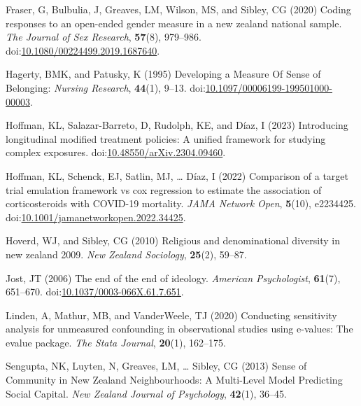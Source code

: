 \documentclass[
  singlecolumn]{article}
\newlength{\cslhangindent}
\newenvironment{CSLReferences}[2] %
 {\begin{list}{}{%
  \setlength{\itemindent}{0pt}
  \setlength{\leftmargin}{0pt}
  \setlength{\parsep}{0pt}
  \ifodd #1
   \setlength{\leftmargin}{\cslhangindent}
   \setlength{\itemindent}{-1\cslhangindent}
  \fi
  \setlength{\itemsep}{#2\baselineskip}}}
 {\end{list}}
\begin{document}
\begin{CSLReferences}{1}{0}
Fraser, G, Bulbulia, J, Greaves, LM, Wilson, MS, and Sibley, CG (2020)
Coding responses to an open-ended gender measure in a new zealand
national sample. \emph{The Journal of Sex Research}, \textbf{57}(8),
979--986.
doi:\href{https://doi.org/10.1080/00224499.2019.1687640}{10.1080/00224499.2019.1687640}.

Hagerty, BMK, and Patusky, K (1995) Developing a Measure Of Sense of
Belonging: \emph{Nursing Research}, \textbf{44}(1), 9--13.
doi:\href{https://doi.org/10.1097/00006199-199501000-00003}{10.1097/00006199-199501000-00003}.

Hoffman, KL, Salazar-Barreto, D, Rudolph, KE, and Díaz, I (2023)
Introducing longitudinal modified treatment policies: A unified
framework for studying complex exposures.
doi:\href{https://doi.org/10.48550/arXiv.2304.09460}{10.48550/arXiv.2304.09460}.

Hoffman, KL, Schenck, EJ, Satlin, MJ, \ldots{} Díaz, I (2022) Comparison
of a target trial emulation framework vs cox regression to estimate the
association of corticosteroids with COVID-19 mortality. \emph{JAMA
Network Open}, \textbf{5}(10), e2234425.
doi:\href{https://doi.org/10.1001/jamanetworkopen.2022.34425}{10.1001/jamanetworkopen.2022.34425}.

Hoverd, WJ, and Sibley, CG (2010) Religious and denominational diversity
in new zealand 2009. \emph{New Zealand Sociology}, \textbf{25}(2),
59--87.

Jost, JT (2006) The end of the end of ideology. \emph{American
Psychologist}, \textbf{61}(7), 651--670.
doi:\href{https://doi.org/10.1037/0003-066X.61.7.651}{10.1037/0003-066X.61.7.651}.

Linden, A, Mathur, MB, and VanderWeele, TJ (2020) Conducting sensitivity
analysis for unmeasured confounding in observational studies using
e-values: The evalue package. \emph{The Stata Journal}, \textbf{20}(1),
162--175.

Sengupta, NK, Luyten, N, Greaves, LM, \ldots{} Sibley, CG (2013) Sense
of Community in New Zealand Neighbourhoods: A Multi-Level Model
Predicting Social Capital. \emph{New Zealand Journal of Psychology},
\textbf{42}(1), 36--45.


\end{CSLReferences}
\end{document}

